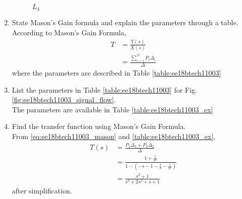 \begin{enumerate}[label=\thesubsection.\arabic*.,ref=\thesubsection.\theenumi]
\begin{figure}[!ht]
\begin{center}
		\resizebox{\columnwidth}{!}{}
	\end{center}
\caption{$L_4$}
\label{fig:ee18btech11003_L4}
\end{figure}

\renewcommand{\thefigure}{\theenumi}

\item State Mason's Gain formula and explain the parameters through a table.
\\
\solution 
According to Mason's Gain Formula,
\begin{align}
T &= \frac{Y(s)}{X(s)} 
\\
 &= \frac{\sum_{i=1}^{N} P_i\Delta_i}{\Delta}
\label{eq:ee18btech11003_mason}
\end{align}
%
where the parameters are described in Table \ref{table:ee18btech11003}
\begin{table}[!ht]
\centering

\caption{}
\label{table:ee18btech11003}
\end{table}
\item List the parameters in Table \ref{table:ee18btech11003}
for Fig. \ref{fig:ee18btech11003_signal_flow}.
\\
\solution The parameters are available in Table \ref{table:ee18btech11003_ex}

\begin{table}[!ht]
\centering

\caption{}
\label{table:ee18btech11003_ex}
\end{table}

\item  Find the transfer function using Mason's Gain Formula.
\renewcommand{\thefigure}{\theenumi.\arabic{figure}}
%
\\
\solution From \eqref{eq:ee18btech11003_mason} and \ref{table:ee18btech11003_ex},
\begin{align}
T(s)&=\frac{P_1 \Delta_1+P_2 \Delta_2}{\Delta}
\\
&=\frac{1 +\frac{1}{s^2}}{1-(-s-1-\frac{1}{s}-\frac{1}{s^2})}
\\
&=\frac{s^2+1}{s^3+2s^2+s+1}
\label{eq:ee18btech11003_gain_sol}
\end{align}
%
after simplification.
\renewcommand{\thefigure}{\theenumi}
\end{enumerate}
